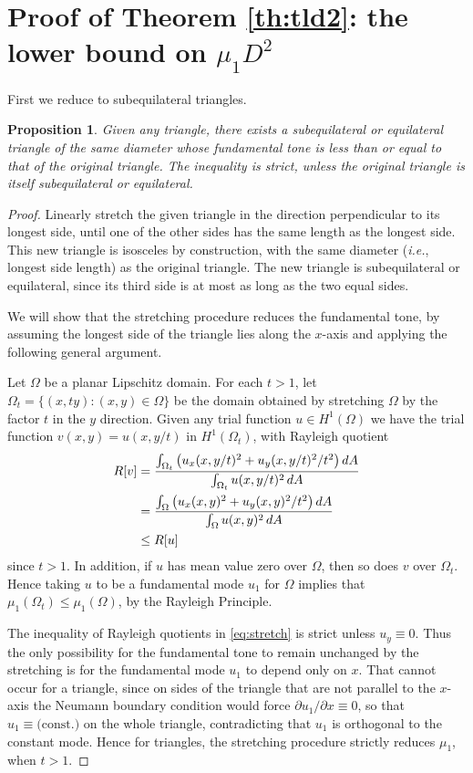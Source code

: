 \documentclass[11pt,reqno]{amsart}
\newtheorem{proposition}[theorem]{Proposition}
\numberwithin{equation}{section}
\begin{document}
\section{\bf Proof of Theorem \ref{th:tld2}: the lower bound on $\mu_1 D^2$} \label{sec:bisec}

First we reduce to subequilateral triangles.
\begin{proposition} \label{pr:sharp}
Given any triangle, there exists a subequilateral or equilateral triangle of the
same diameter whose fundamental tone is less than or equal
to that of the original triangle. The inequality is strict,
unless the original triangle is itself subequilateral or equilateral.
\end{proposition}
\begin{proof}
Linearly stretch the given triangle in the direction perpendicular
to its longest side, until one of the other sides has the same
length as the longest side. This new triangle is isosceles by
construction, with the same diameter (\emph{i.e.}, longest side
length) as the original triangle. The new triangle is
subequilateral or equilateral, since its third side is at most as
long as the two equal sides.

We will show that the stretching procedure reduces
the fundamental tone, by assuming the longest side of the triangle lies along
the $x$-axis and applying the following general argument.

Let $\Omega$ be a planar Lipschitz domain. For each $t > 1$, let
$\Omega_t = \{ (x,ty) : (x,y) \in \Omega \}$ be the domain obtained
by stretching $\Omega$ by the factor $t$ in the $y$ direction. Given
any trial function $u \in H^1(\Omega)$ we have the trial function
$v(x,y)=u(x,y/t)$ in $H^1(\Omega_t)$, with Rayleigh quotient
\begin{align}
R[v] & = \frac{\int_{\Omega_t} \big( u_x(x,y/t)^2+
u_y(x,y/t)^2/t^2 \big) \, dA}{\int_{\Omega_t} u(x,y/t)^2 \, dA} \notag \\
& = \frac{\int_\Omega \big( u_x(x,y)^2+u_y(x,y)^2/t^2 \big) \,
dA}{\int_\Omega u(x,y)^2 \, dA} \notag \\
& \leq R[u] \label{eq:stretch}
\end{align}
since $t > 1$. In addition, if $u$ has mean value zero over $\Omega$, then so does $v$ over $\Omega_t$. Hence taking $u$ to be a fundamental mode $u_1$ for $\Omega$ implies that $\mu_1(\Omega_t) \leq \mu_1(\Omega)$, by the Rayleigh Principle.

The inequality of Rayleigh quotients in \eqref{eq:stretch} is strict
unless $u_y \equiv 0$. Thus the only possibility for the fundamental tone to
remain unchanged by the stretching is for the fundamental mode $u_1$ to
depend only on $x$. That cannot occur for a triangle, since
on sides of the triangle that are not parallel to the $x$-axis the Neumann boundary condition would force $\partial u_1 /\partial x \equiv 0$, so that $u_1 \equiv \text{(const.)}$ on the whole triangle, contradicting that $u_1$ is orthogonal to the constant mode.
Hence for triangles, the stretching procedure strictly reduces
$\mu_1$, when $t>1$.
\end{proof}
\end{document}
